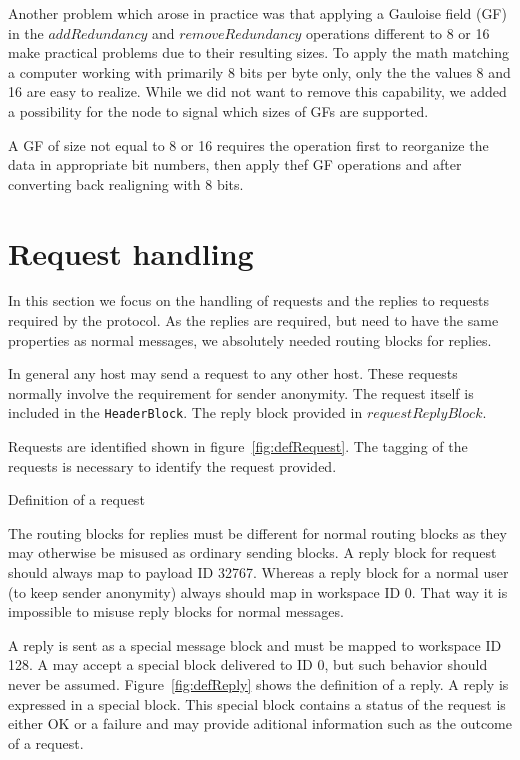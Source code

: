 Another problem which arose in practice was that applying a Gauloise field (GF) in the $addRedundancy$ and $removeRedundancy$ operations different to 8 or 16 make practical problems due to their resulting sizes. To apply the math matching a computer working with primarily 8 bits per byte only, only the the values 8 and 16 are easy to realize. While we did not want to remove this capability, we added a possibility for the node to signal which sizes of GFs are supported.

A GF of size not equal to 8 or 16 requires the operation first to reorganize the data in appropriate bit numbers, then apply thef GF operations and after converting back realigning with 8 bits.

\section{Request handling}
In this section we focus on the handling of requests and the replies to requests required by the protocol. As the replies are required, but need to have the same properties as normal messages, we absolutely needed routing blocks for replies.

In general any host may send a request to any other host. These requests normally involve the requirement for sender anonymity. The request itself is included in the \lstinline[columns=fixed,basicstyle=\normalsize]{HeaderBlock}. The reply block provided in $requestReplyBlock$.

Requests are identified shown in figure~\ref{fig:defRequest}. The tagging of the requests is necessary to identify the request provided.

\begin{lstfloat}[ht]
	
	\caption{Definition of a request}
	\label{fig:defRequest}
\end{lstfloat}

The routing blocks for replies must be different for normal routing blocks as they may otherwise be misused as ordinary sending blocks. A reply block for request should always map to payload ID 32767. Whereas a reply block for a normal user (to keep sender anonymity) always should map in workspace ID 0. That way it is impossible to misuse reply blocks for normal messages.

A reply is sent as a special message block and must be mapped to workspace ID 128. A \VortexNode{} may accept a special block delivered to ID 0, but such behavior should never be assumed. Figure~\ref{fig:defReply} shows the definition of a reply. A reply is expressed in a special block. This special block contains a status of the request is either OK or a failure and may provide aditional information such as the outcome of a request.


